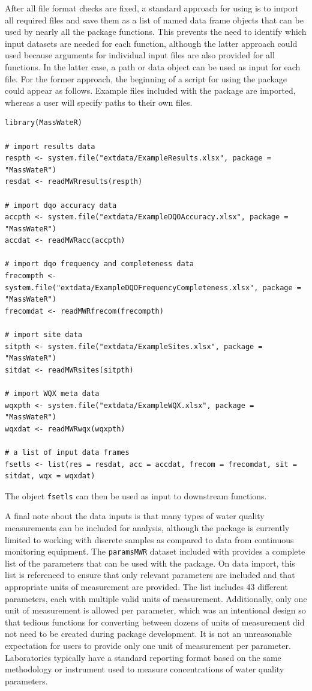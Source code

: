 After all file format checks are fixed, a standard approach for using  is to import all required files and save them as a list of named data frame objects that can be used by nearly all the package functions. This prevents the need to identify which input datasets are needed for each function, although the latter approach could used because arguments for individual input files are also provided for all functions. In the latter case, a path or data object can be used as input for each file. For the former approach, the beginning of a script for using the package could appear as follows. Example files included with the package are imported, whereas a user will specify paths to their own files.

\begin{verbatim}
library(MassWateR)

# import results data
respth <- system.file("extdata/ExampleResults.xlsx", package = "MassWateR")
resdat <- readMWRresults(respth)

# import dqo accuracy data
accpth <- system.file("extdata/ExampleDQOAccuracy.xlsx", package = "MassWateR")
accdat <- readMWRacc(accpth)

# import dqo frequency and completeness data
frecompth <- system.file("extdata/ExampleDQOFrequencyCompleteness.xlsx", package = "MassWateR")
frecomdat <- readMWRfrecom(frecompth)

# import site data
sitpth <- system.file("extdata/ExampleSites.xlsx", package = "MassWateR")
sitdat <- readMWRsites(sitpth)

# import WQX meta data
wqxpth <- system.file("extdata/ExampleWQX.xlsx", package = "MassWateR")
wqxdat <- readMWRwqx(wqxpth)

# a list of input data frames
fsetls <- list(res = resdat, acc = accdat, frecom = frecomdat, sit = sitdat, wqx = wqxdat)
\end{verbatim}

The object \texttt{fsetls} can then be used as input to downstream functions.

A final note about the data inputs is that many types of water quality measurements can be included for analysis, although the package is currently limited to working with discrete samples as compared to data from continuous monitoring equipment. The \texttt{paramsMWR} dataset included with  provides a complete list of the parameters that can be used with the package. On data import, this list is referenced to ensure that only relevant parameters are included and that appropriate units of measurement are provided. The list includes 43 different parameters, each with multiple valid units of measurement. Additionally, only one unit of measurement is allowed per parameter, which was an intentional design so that tedious functions for converting between dozens of units of measurement did not need to be created during package development. It is not an unreasonable expectation for users to provide only one unit of measurement per parameter. Laboratories typically have a standard reporting format based on the same methodology or instrument used to measure concentrations of water quality parameters.

